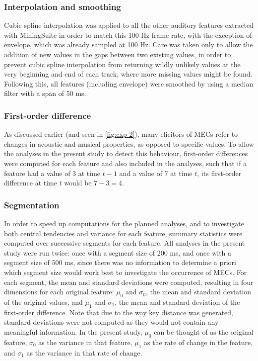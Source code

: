 \subsubsection{Interpolation and smoothing}

Cubic spline interpolation was applied to all the other auditory features extracted with MiningSuite in order to match this 100 Hz frame rate, with the exception of envelope, which was already sampled at 100 Hz. Care was taken only to allow the addition of new values in the gaps between two existing values, in order to prevent cubic spline interpolation from returning wildly unlikely values at the very beginning and end of each track, where more missing values might be found. Following this, all features (including envelope) were smoothed by using a median filter with a span of 50 ms.

\subsubsection{First-order difference}

As discussed earlier (and seen in \autoref{fig:exp-2}), many elicitors of MECs refer to changes in acoustic and musical properties, as opposed to specific values. To allow the analyses in the present study to detect this behaviour, first-order differences were computed for each feature and also included in the analyses, such that if a feature had a value of 3 at time $t - 1$ and a value of 7 at time $t$, its first-order difference at time $t$ would be $7 - 3 = 4$.

\subsubsection{Segmentation}

In order to speed up computations for the planned analyses, and to investigate both central tendencies and variance for each feature, summary statistics were computed over successive segments for each feature. All analyses in the present study were run twice: once with a segment size of 200 ms, and once with a segment size of 500 ms, since there was no information to determine a priori which segment size would work best to investigate the occurrence of MECs. For each segment, the mean and standard deviations were computed, resulting in four dimensions for each original feature: $\mu_0$ and $\sigma_0$, the mean and standard deviation of the original values, and $\mu_1$ and $\sigma_1$, the mean and standard deviation of the first-order difference. Note that due to the way key distance was generated, standard deviations were not computed as they would not contain any meaningful information. In the present study, $\mu_0$ can be thought of as the original feature, $\sigma_0$ as the variance in that feature, $\mu_1$ as the rate of change in the feature, and $\sigma_1$ as the variance in that rate of change.

